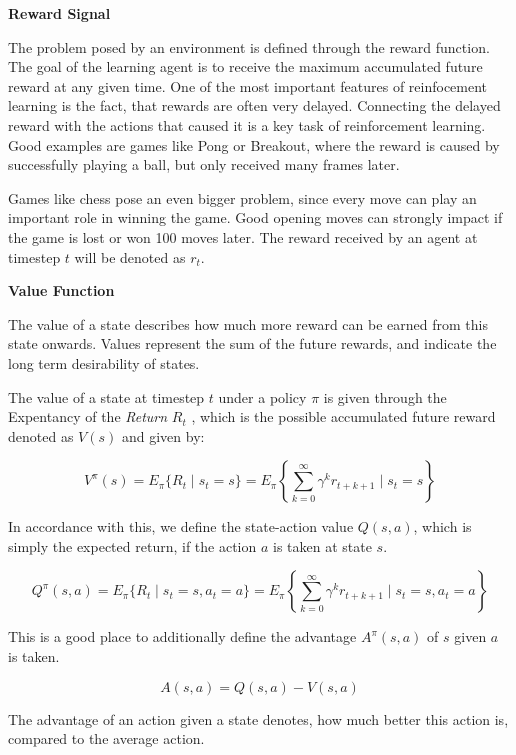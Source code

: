 \textbf{Reward Signal}

The problem posed by an environment is defined through the reward function. 
The goal of the learning agent is to receive the maximum accumulated future reward at any given time. One of the most important features of reinfocement learning is the fact, that rewards are often very delayed. Connecting the delayed reward with the actions that caused it is a key task of reinforcement learning.
Good examples are games like Pong or Breakout, where the reward is caused by successfully playing a ball, but only received many frames later.

Games like chess pose an even bigger problem, since every move can play an important role in winning the game. Good opening moves can strongly impact if the game is lost or won 100 moves later.
The reward received by an agent at timestep $t$ will be denoted as $r_t$.

\textbf{Value Function}

The value of a state describes how much more reward can be earned from this state onwards. Values represent the sum of the future rewards, and indicate the long term desirability of states.

The value of a state at timestep $t$ under a policy $\pi$ is given through the Expentancy of the \textit{Return} $R_t$ , which is the possible accumulated future reward denoted as $V(s)$ and given by:

\begin{equation}
{
V^\pi (s) = E_\pi \{R_t \mid s_t = s\} = E_\pi \left\{ \sum_{k=0}^\infty \gamma^k r_{t+k+1} \mid s_t = s \right\}
}
\end{equation}

In accordance with this, we define the state-action value $Q(s,a)$, which is simply the expected return, if the action $a$ is taken at state $s$.

\begin{equation}
{
Q^\pi (s,a) = E_\pi \{R_t \mid s_t = s, a_t = a\} = E_\pi \left\{ \sum_{k=0}^\infty \gamma^k r_{t+k+1} \mid s_t = s, a_t = a \right\}
}
\end{equation}

This is a good place to additionally define the advantage $A^\pi(s,a)$ of  $s$ given $a$ is taken.

\begin{equation}
A(s,a) = Q(s,a)-V(s,a)
\label{adv}
\end{equation}

The advantage of an action given a state denotes, how much better this action is, compared to the average action.

